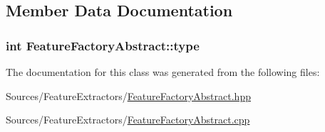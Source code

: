 \subsection{Member Data Documentation}
\hypertarget{class_feature_factory_abstract_acdc4ca5ce9d35423f420c53081f0f238}{
\subsubsection[{type}]{\setlength{\rightskip}{0pt plus 5cm}int Feature\+Factory\+Abstract\+::type\hspace{0.3cm}{\ttfamily [private]}}}\label{class_feature_factory_abstract_acdc4ca5ce9d35423f420c53081f0f238}


The documentation for this class was generated from the following files\+:\begin{DoxyCompactItemize}
\item 
Sources/\+Feature\+Extractors/\hyperlink{_feature_factory_abstract_8hpp}{Feature\+Factory\+Abstract.\+hpp}\item 
Sources/\+Feature\+Extractors/\hyperlink{_feature_factory_abstract_8cpp}{Feature\+Factory\+Abstract.\+cpp}\end{DoxyCompactItemize}
